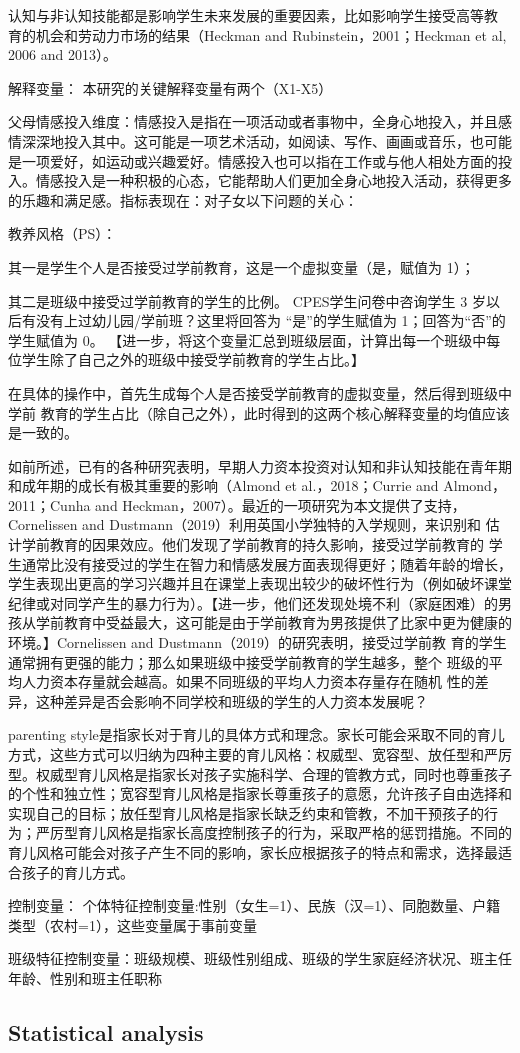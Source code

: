 认知与非认知技能都是影响学生未来发展的重要因素，比如影响学生接受高等教 育的机会和劳动力市场的结果（Heckman and Rubinstein，2001；Heckman et al, 2006 and 2013）。

解释变量：
本研究的关键解释变量有两个（X1-X5）

父母情感投入维度：情感投入是指在一项活动或者事物中，全身心地投入，并且感情深深地投入其中。这可能是一项艺术活动，如阅读、写作、画画或音乐，也可能是一项爱好，如运动或兴趣爱好。情感投入也可以指在工作或与他人相处方面的投入。情感投入是一种积极的心态，它能帮助人们更加全身心地投入活动，获得更多的乐趣和满足感。指标表现在：对子女以下问题的关心：

教养风格（PS）：



其一是学生个人是否接受过学前教育，这是一个虚拟变量（是，赋值为 1）；

其二是班级中接受过学前教育的学生的比例。 CPES学生问卷中咨询学生 3 岁以后有没有上过幼儿园/学前班？这里将回答为 “是”的学生赋值为 1；回答为“否”的学生赋值为 0。
【进一步，将这个变量汇总到班级层面，计算出每一个班级中每位学生除了自己之外的班级中接受学前教育的学生占比。】

在具体的操作中，首先生成每个人是否接受学前教育的虚拟变量，然后得到班级中学前 教育的学生占比（除自己之外），此时得到的这两个核心解释变量的均值应该是一致的。


如前所述，已有的各种研究表明，早期人力资本投资对认知和非认知技能在青年期和成年期的成长有极其重要的影响（Almond et al.，2018；Currie and Almond，2011；Cunha and Heckman，2007）。最近的一项研究为本文提供了支持，Cornelissen and Dustmann（2019）利用英国小学独特的入学规则，来识别和 估计学前教育的因果效应。他们发现了学前教育的持久影响，接受过学前教育的 学生通常比没有接受过的学生在智力和情感发展方面表现得更好；随着年龄的增长，学生表现出更高的学习兴趣并且在课堂上表现出较少的破坏性行为（例如破坏课堂纪律或对同学产生的暴力行为）。【进一步，他们还发现处境不利（家庭困难）的男孩从学前教育中受益最大，这可能是由于学前教育为男孩提供了比家中更为健康的环境。】Cornelissen and Dustmann（2019）的研究表明，接受过学前教 育的学生通常拥有更强的能力；那么如果班级中接受学前教育的学生越多，整个 班级的平均人力资本存量就会越高。如果不同班级的平均人力资本存量存在随机 性的差异，这种差异是否会影响不同学校和班级的学生的人力资本发展呢？

parenting style是指家长对于育儿的具体方式和理念。家长可能会采取不同的育儿方式，这些方式可以归纳为四种主要的育儿风格：权威型、宽容型、放任型和严厉型。权威型育儿风格是指家长对孩子实施科学、合理的管教方式，同时也尊重孩子的个性和独立性；宽容型育儿风格是指家长尊重孩子的意愿，允许孩子自由选择和实现自己的目标；放任型育儿风格是指家长缺乏约束和管教，不加干预孩子的行为；严厉型育儿风格是指家长高度控制孩子的行为，采取严格的惩罚措施。不同的育儿风格可能会对孩子产生不同的影响，家长应根据孩子的特点和需求，选择最适合孩子的育儿方式。

控制变量：
个体特征控制变量:性别（女生=1）、民族（汉=1）、同胞数量、户籍类型（农村=1），这些变量属于事前变量

班级特征控制变量：班级规模、班级性别组成、班级的学生家庭经济状况、班主任年龄、性别和班主任职称



\subsection{Statistical analysis}


